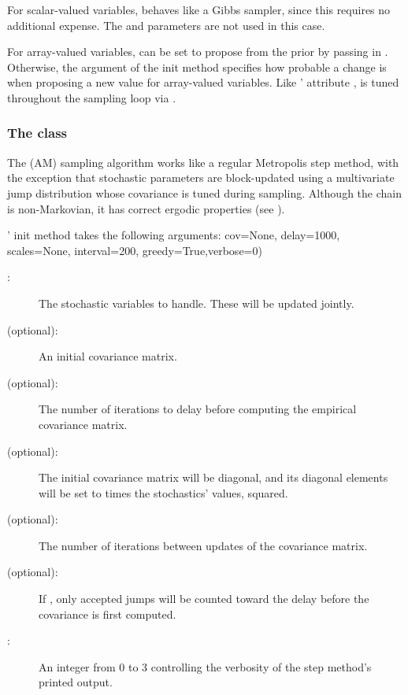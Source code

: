 For scalar-valued variables,  behaves like a Gibbs sampler, since this requires no additional expense. The  and  parameters are not used in this case.

For array-valued variables,  can be set to propose from the prior by passing in . Otherwise, the argument  of the init method specifies how probable a change is when proposing a new value for array-valued variables. Like ' attribute ,  is tuned throughout the sampling loop via .

\subsubsection[The AdaptiveMetropolis class]{The
 class} 
The  (AM) sampling algorithm works like a regular Metropolis step method, with the exception that stochastic parameters are block-updated using a multivariate jump distribution whose covariance is tuned during sampling. Although the chain is non-Markovian, it has correct ergodic properties (see \cite{Haario:2001lr}).

' init method takes the following arguments:
cov=None, delay=1000, scales=None, interval=200, greedy=True,verbose=0)
\begin{description}
   \item[:] The stochastic variables to handle. These will be updated jointly.
   \item[ (optional):] An initial covariance matrix.
   \item[ (optional):] The number of iterations to delay before computing the empirical covariance matrix.
   \item[ (optional):] The initial covariance matrix will be diagonal, and its diagonal elements will be set to  times the stochastics' values, squared.
   \item[ (optional):] The number of iterations between updates of the covariance matrix.
   \item[ (optional):] If , only accepted jumps will be counted toward the delay before the covariance is first computed.
   \item[:] An integer from 0 to 3 controlling the verbosity of the step method's printed output.   
\end{description}
 

